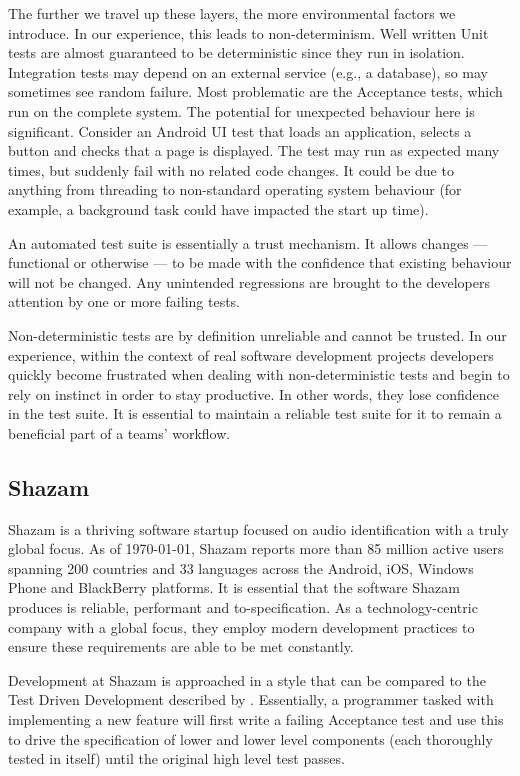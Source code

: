 The further we travel up these layers, the more environmental factors we introduce. In our experience, this leads to non-determinism. Well written Unit tests are almost guaranteed to be deterministic since they run in isolation. Integration tests may depend on an external service (e.g., a database), so may sometimes see random failure. Most problematic are the Acceptance tests, which run on the complete system. The potential for unexpected behaviour here is significant. Consider an Android UI test that loads an application, selects a button and checks that a page is displayed. The test may run as expected many times, but suddenly fail with no related code changes. It could be due to anything from threading to non-standard operating system behaviour (for example, a background task could have impacted the start up time).

An automated test suite is essentially a trust mechanism. It allows changes --- functional or otherwise --- to be made with the confidence that existing behaviour will not be changed. Any unintended regressions are brought to the developers attention by one or more failing tests.

Non-deterministic tests are by definition unreliable and cannot be trusted. In our experience, within the context of real software development projects developers quickly become frustrated when dealing with non-deterministic tests and begin to rely on instinct in order to stay productive. In other words, they lose confidence in the test suite. It is essential to maintain a reliable test suite for it to remain a beneficial part of a teams' workflow.

\subsection{Shazam}

Shazam is a thriving software startup focused on audio identification with a truly global focus. As of \today, Shazam reports more than 85 million active users spanning 200 countries and 33 languages across the Android, iOS, Windows Phone and BlackBerry platforms. It is essential that the software Shazam produces is reliable, performant and to-specification. As a technology-centric company with a global focus, they employ modern development practices to ensure these requirements are able to be met constantly.

Development at Shazam is approached in a style that can be compared to the Test Driven Development described by \citet*{freeman2009growing}. Essentially, a programmer tasked with implementing a new feature will first write a failing Acceptance test and use this to drive the specification of lower and lower level components (each thoroughly tested in itself) until the original high level test passes.

